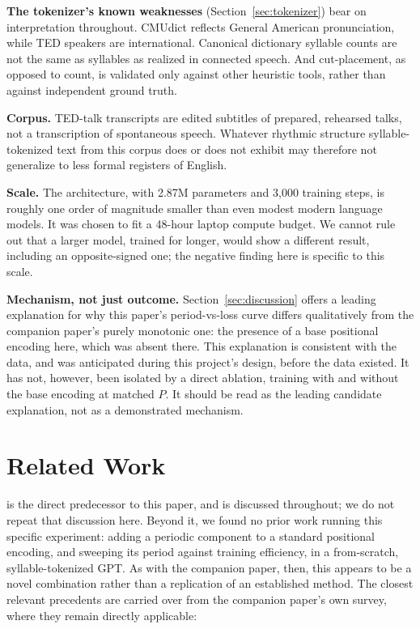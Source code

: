 \documentclass[11pt]{article}
\begin{document}
\textbf{The tokenizer's known weaknesses} (Section~\ref{sec:tokenizer}) bear on interpretation throughout. CMUdict reflects General American pronunciation, while TED speakers are international. Canonical dictionary syllable counts are not the same as syllables as realized in connected speech. And cut-placement, as opposed to count, is validated only against other heuristic tools, rather than against independent ground truth.

\textbf{Corpus.} TED-talk transcripts are edited subtitles of prepared, rehearsed talks, not a transcription of spontaneous speech. Whatever rhythmic structure syllable-tokenized text from this corpus does or does not exhibit may therefore not generalize to less formal registers of English.

\textbf{Scale.} The architecture, with 2.87M parameters and 3{,}000 training steps, is roughly one order of magnitude smaller than even modest modern language models. It was chosen to fit a 48-hour laptop compute budget. We cannot rule out that a larger model, trained for longer, would show a different result, including an opposite-signed one; the negative finding here is specific to this scale.

\textbf{Mechanism, not just outcome.} Section~\ref{sec:discussion} offers a leading explanation for why this paper's period-vs-loss curve differs qualitatively from the companion paper's purely monotonic one: the presence of a base positional encoding here, which was absent there. This explanation is consistent with the data, and was anticipated during this project's design, before the data existed. It has not, however, been isolated by a direct ablation, training with and without the base encoding at matched $P$. It should be read as the leading candidate explanation, not as a demonstrated mechanism.

\section{Related Work}
\label{sec:related}

\citet{nabijou2026} is the direct predecessor to this paper, and is discussed throughout; we do not repeat that discussion here. Beyond it, we found no prior work running this specific experiment: adding a periodic component to a standard positional encoding, and sweeping its period against training efficiency, in a from-scratch, syllable-tokenized GPT. As with the companion paper, then, this appears to be a novel combination rather than a replication of an established method. The closest relevant precedents are carried over from the companion paper's own survey, where they remain directly applicable:
\end{document}
